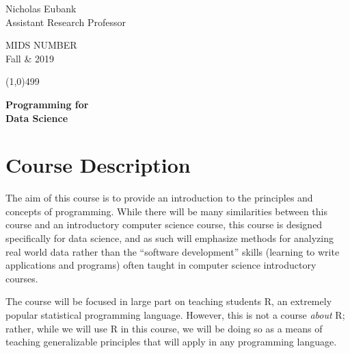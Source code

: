 \documentclass[12pt]{article}
\begin{document}
\singlespacing






\thispagestyle{empty}
\begin{minipage}[t]{.5\textwidth}
	Nicholas Eubank \\
	 Assistant Research Professor\\
     \vspace*{0.1cm}
\end{minipage}
\begin{minipage}[t]{.5\textwidth}
	\begin{flushright}  MIDS NUMBER\\
	Fall \& 2019\\
    \vspace*{0.1cm}
\end{flushright}
\end{minipage}


\line(1,0){499}

\vspace{.35in}

\begin{center}
	\textbf{\LARGE{Programming for} }\\
	\vspace*{.05in}
	\textbf{\LARGE{Data Science} }
\end{center}








\section{Course Description}

The aim of this course is to provide an introduction to the principles and concepts of programming. While there will be many similarities between this course and an introductory computer science course, this course is designed specifically for data science, and as such will emphasize methods for analyzing real world data rather than the ``software development'' skills (learning to write applications and programs) often taught in computer science introductory courses.

The course will be focused in large part on teaching students R, an extremely popular statistical programming language. However, this is not a course \emph{about} R; rather, while we will use R in this course, we will be doing so as a means of teaching generalizable principles that will apply in any programming language.
\end{document}
